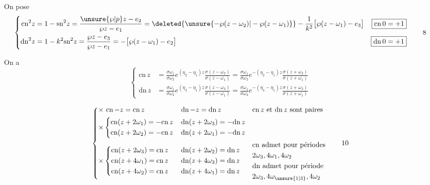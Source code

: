 On pose
\[
\left\{\begin{aligned}
\mathrm{cn}^2z&=1-\mathrm{sn}^2z=\frac{\unsure{\wp|p}z-e_2}{\wp z-e_1}=\deleted{\unsure{-\wp(z-\omega_2)|-\wp(z-\omega_1)}}-\frac1{k^2}\bigl[\wp(z-\omega_1)-e_3\bigr]
&\boxed{\mathrm{cn}\,0=+1}\\
\mathrm{dn}^2z&=1-k^2\mathrm{sn}^2z=\frac{\wp z-e_3}{\wp z-e_1}=-\bigl[\wp(z-\omega_1)-e_2\bigr]
&\boxed{\mathrm{dn}\,0=+1}
\end{aligned}\right. \tag*{8}
\]

On a
\[
\left\{\begin{aligned}
\mathrm{cn}\,z&=\frac{\sigma\omega_1}{\sigma\omega_2}e^{(\eta_{2}-\eta_1)z}\frac{\sigma(z-\omega_2)}{\sigma(z-\omega_1)}
=\frac{\sigma\omega_1}{\sigma\omega_2}e^{-(\eta_2-\eta_1)z}\frac{\sigma(z+\omega_2)}{\sigma(z+\omega_1)}\\
\mathrm{dn}\,z&=\frac{\sigma\omega_1}{\sigma\omega_3}e^{(\eta_3-\eta_1)z}\frac{\sigma(z-\omega_3)}{\sigma(z-\omega_1)}
=\frac{\sigma\omega_1}{\sigma\omega_3}e^{-(\eta_3-\eta_1)z}\frac{\sigma(z+\omega_3)}{\sigma(z+\omega_1)}
\end{aligned}\right. \tag*{9}
\]

\[
\left\{\begin{aligned}
&{\times}\ \mathrm{cn}\,{-z}=\mathrm{cn}\,z &&\mathrm{dn}\,{-z}=\mathrm{dn}\,z &&\mathrm{cn}\,z\text{ et }\mathrm{dn}\,z\text{ sont paires}\\
&{\times}\left\{\begin{aligned}
\mathrm{cn}(z+2\omega_1)&=-\mathrm{cn}\,z\\
\mathrm{cn}(z+2\omega_2)&=-\mathrm{cn}\,z
\end{aligned}\right. &&
\begin{aligned}\mathrm{dn}(z+2\omega_3)&=-\mathrm{dn}\,z\\
\mathrm{dn}(z+2\omega_1)&=-\mathrm{dn}\,z\end{aligned}\\
&{\times}\left\{\begin{aligned}
\mathrm{cn}(z+2\omega_3)&=\mathrm{cn}\,z\\
\mathrm{cn}(z+4\omega_1)&=\mathrm{cn}\,z\\
\mathrm{cn}(z+4\omega_2)&=\mathrm{cn}\,z
\end{aligned}\right. &&
\begin{aligned}\mathrm{dn}(z+2\omega_2)&=\mathrm{dn}\,z\\
\mathrm{dn}(z+4\omega_3)&=\mathrm{dn}\,z\\
\mathrm{dn}(z+4\omega_1)&=\mathrm{dn}\,z\end{aligned} &&
\begin{aligned}&\mathrm{cn}\text{ admet pour périodes}\\&2\omega_3,4\omega_1,4\omega_2\\
&\mathrm{dn}\text{ admet pour période}\\&2\omega_3,4\omega_{\unsure{1|3}},4\omega_2\end{aligned}
\end{aligned}\right. \tag*{10}
\]

